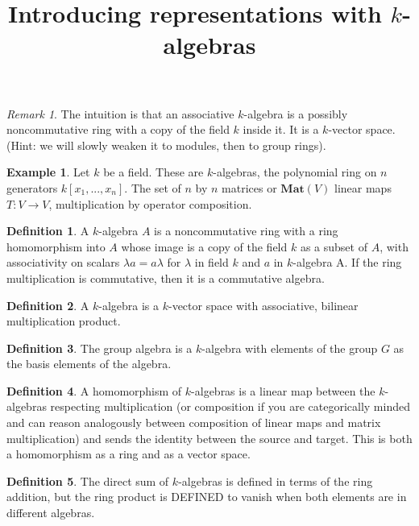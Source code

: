 \documentclass[10pt]{article}
\theoremstyle{plain}%
\theoremstyle{definition}
\newtheorem{definition}{Definition}[section]
\newtheorem{example}{Example}[section]
\theoremstyle{remark}
\newtheorem*{remark}{Remark}
\begin{document}
\title{Introducing representations with $k$-algebras}

\maketitle

\begin{remark}
	The intuition is that an associative $k$-algebra is a possibly noncommutative ring with a copy of the field $k$ inside it. It is a $k$-vector space. (Hint: we will slowly weaken it to modules, then to group rings).
\end{remark}

\begin{example}
	Let $k$ be a field. These are $k$-algebras, the polynomial ring on $n$ generators $k[x_1, ..., x_n]$. The set of $n$ by $n$ matrices or $\mathbf{Mat}(V)$ linear maps $T : V \rightarrow V$, multiplication by operator composition.
\end{example}

\begin{definition}
	A $k$-algebra $A$ is a noncommutative ring with a ring homomorphism into $A$ whose image is a copy of the field $k$ as a subset of $A$, with associativity on scalars $\lambda a = a \lambda$ for $\lambda$ in field $k$ and $a$ in $k$-algebra A. If the ring multiplication is commutative, then it is a commutative algebra.  
\end{definition}

\begin{definition}
	A $k$-algebra is a $k$-vector space with associative, bilinear multiplication product.
\end{definition}

\begin{definition}
	The group algebra is a $k$-algebra with elements of the group $G$ as the basis elements of the algebra.
\end{definition}

\begin{definition}
	A homomorphism of $k$-algebras is a linear map between the $k$-algebras respecting multiplication (or composition if you are categorically minded and can reason analogously between composition of linear maps and matrix multiplication) and sends the identity between the source and target. This is both a homomorphism as a ring and as a vector space.
\end{definition}

\begin{definition}
	The direct sum of $k$-algebras is defined in terms of the ring addition, but the ring product is DEFINED to vanish when both elements are in different algebras.
\end{definition}
\end{document}
